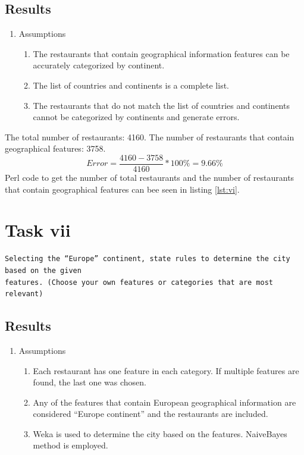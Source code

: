 \documentclass[letterpaper,10pt]{article}
\begin{document}
\subsection*{Results}
\begin{enumerate}
\item Assumptions 
\begin{enumerate}
\item The restaurants that contain geographical information features can be accurately categorized by continent.
\item The list of countries and continents is a complete list.
\item The restaurants that do not match the list of countries and continents cannot be categorized by continents and generate errors.
\end{enumerate} 
\end{enumerate}
The total number of restaurants: 4160.
The number of restaurants that contain geographical features: 3758.
$$Error=\frac{4160 - 3758}{4160} * 100\% = 9.66\%$$ 
Perl code to get the number of total restaurants and the number of restaurants that contain geographical features can bee seen in listing \hyperref[lst:vi]{\ref{lst:vi}}.
\clearpage
\newpage
{}
\section*{Task vii}
\begin{verbatim}
Selecting the “Europe” continent, state rules to determine the city based on the given
features. (Choose your own features or categories that are most relevant)
\end{verbatim}
\subsection*{Results}
\begin{enumerate}
\item Assumptions 
\begin{enumerate}
\item Each restaurant has one feature in each category. If multiple features are found, the last one was chosen.
\item Any of the features that contain European geographical information are considered “Europe continent” and the restaurants are included.
\item Weka is used to determine the city based on the features. NaiveBayes method is employed.
\end{enumerate} 
\end{enumerate}
\end{document}
